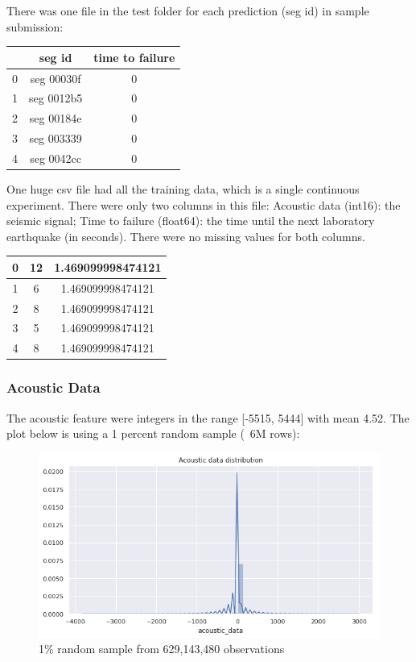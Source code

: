 \documentclass[]{llncs}
\begin{document}
There was one file in the test folder for each prediction (seg id) in sample submission: \par
\begin{tabular}{|c|c|c|}
	\hline 
	& seg id & time to failure \\ 
	\hline 
	0 & seg 00030f & 0 \\ 
	\hline 
	1 & seg 0012b5 & 0 \\ 
	\hline 
	2 & seg 00184e & 0 \\ 
	\hline 
	3 & seg 003339 & 0 \\ 
	\hline 
	4 & seg 0042cc & 0 \\ 
	\hline 
\end{tabular} 

One huge csv file had all the training data, which is a single continuous experiment. There were only two columns in this file:
Acoustic data (int16): the seismic signal; Time to failure (float64): the time until the next laboratory earthquake (in seconds). There were no missing values for both columns. \par

\begin{tabular}{|c|c|c|}
	\hline 
	\rule[-1ex]{0pt}{2.5ex} 0 & 12 & 1.469099998474121 \\ 
	\hline 
	\rule[-1ex]{0pt}{2.5ex} 1 & 6 & 1.469099998474121 \\ 
	\hline 
	\rule[-1ex]{0pt}{2.5ex} 2 & 8 & 1.469099998474121 \\ 
	\hline 
	\rule[-1ex]{0pt}{2.5ex} 3 & 5 & 1.469099998474121 \\ 
	\hline 
	\rule[-1ex]{0pt}{2.5ex} 4 & 8 & 1.469099998474121 \\ 
	\hline 
\end{tabular} 

\subsubsection{Acoustic Data}
The acoustic feature were integers in the range [-5515, 5444] with mean 4.52. The plot below is using a 1 percent random sample (~6M rows):
\begin{figure}[h]
	\centering
	\includegraphics[width=0.7\linewidth]{../GPUProject/acousticFeatureIntegers}
	\caption[]{1\% random sample from 629,143,480 observations}
	\label{fig:acousticfeatureintegers}
\end{figure}
\end{document}
